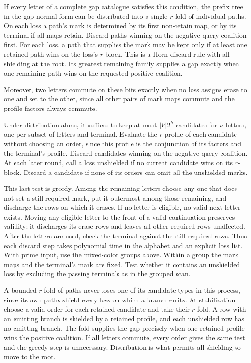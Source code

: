 If every letter of a complete gap catalogue satisfies
this condition, the prefix tree in the gap normal form
can be distributed into a single $r$-fold of individual
paths. On each loss a path's mark is determined by its
first non-retain map, or by its terminal if all maps
retain. Discard paths winning on the negative query
coalition first. For each loss, a path that supplies the
mark may be kept only if at least one retained path
wins on the loss's $r$-block. This is a Horn discard
rule with all shielding at the root. Its greatest
remaining family supplies a gap exactly when one
remaining path wins on the requested positive coalition.

Moreover, two letters commute on these bits exactly
when no loss assigns erase to one and set to the other,
since all other pairs of mark maps commute and the
profile factors always commute.

Under distribution alone, it suffices to keep at most
$|V|2^h$ candidates for $h$ letters, one per subset of
letters and terminal. Evaluate the $r$-profile of each
candidate without choosing an order, since this profile
is the conjunction of its factors and the terminal's
profile. Discard candidates winning on the negative
query coalition. At each later round, call a loss
unshielded if no current candidate wins on its
$r$-block. Discard a candidate if none of its orders
can omit all the unshielded marks.

This last test is greedy. Among the remaining letters
choose any one that does not set a still required mark,
put it outermost among those remaining, and discharge
the rows on which it erases. If no letter is eligible,
no valid next letter exists. Moving any eligible letter
to the front of a valid continuation preserves validity:
it discharges its erase rows and leaves all other
required rows unaffected. After the letters are used,
check the terminal against the still required rows.
Thus each discard step takes polynomial time in the
alphabet and an explicit loss list. With prime input,
use the mixed-color groups above. Within a group the
mark maps and the terminal's mark are fixed. Test
whether it contains an unshielded loss by excluding
the passing terminals as in the grouped scan.

A bounded $r$-fold of paths never loses one of its
candidate types in this process, since its own paths
shield every loss on which a branch emits. At
stabilization choose a valid order for each retained
candidate and take their $r$-fold. A row with an
emitting branch is shielded by a retained profile,
and each unshielded row has no emitting branch.
The fold supplies the gap precisely when one retained
profile wins the positive coalition. If all letters
commute, every order gives the same test and the
greedy step is unnecessary. Distribution is what
permits all shielding to move to the root.

